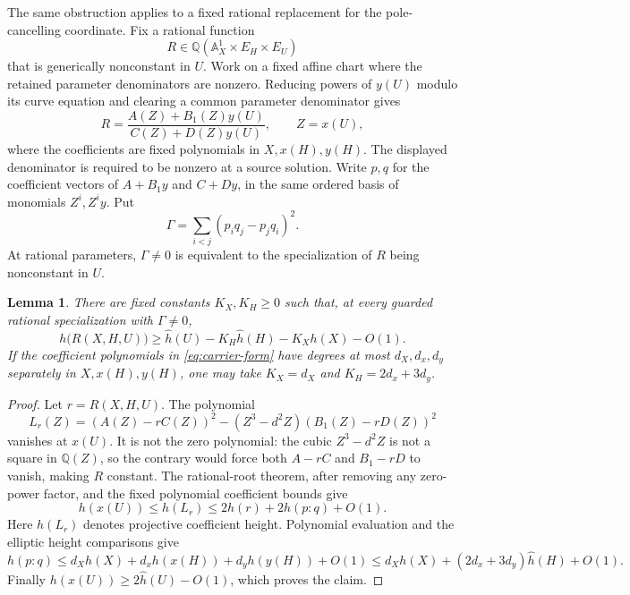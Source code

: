 \documentclass[11pt,a4paper]{article}
\newtheorem{lemma}[theorem]{Lemma}
\newcommand{\Q}{\mathbb Q}\newcommand{\Z}{\mathbb Z}
\begin{document}
The same obstruction applies to a fixed rational replacement for the
pole-cancelling coordinate. Fix a rational function
\[
 R\in\Q(\mathbb A^1_X\times E_H\times E_U)
\]
that is generically nonconstant in $U$. Work on a fixed affine chart
where the retained parameter denominators are nonzero. Reducing
powers of $y(U)$ modulo its curve equation and clearing a common
parameter denominator gives
\begin{equation}\label{eq:carrier-form}
 R=\frac{A(Z)+B_1(Z)y(U)}{C(Z)+D(Z)y(U)},\qquad Z=x(U),
\end{equation}
where the coefficients are fixed polynomials in $X,x(H),y(H)$.
The displayed denominator is required to be nonzero at a source
solution. Write $p,q$ for the coefficient vectors of $A+B_1y$
and $C+Dy$, in the same ordered basis of monomials $Z^i,Z^iy$.
Put
\[
                   \Gamma=\sum_{i<j}(p_iq_j-p_jq_i)^2.
\]
At rational parameters, $\Gamma\ne0$ is equivalent to the
specialization of $R$ being nonconstant in $U$.

\begin{lemma}\label{lem:carrier-height}
There are fixed constants $K_X,K_H\ge0$ such that, at every
guarded rational specialization with $\Gamma\ne0$,
\[
 h\bigl(R(X,H,U)\bigr)
       \ge\widehat h(U)-K_H\widehat h(H)-K_Xh(X)-O(1).
\]
If the coefficient polynomials in \eqref{eq:carrier-form} have
degrees at most $d_X,d_x,d_y$ separately in $X,x(H),y(H)$,
one may take $K_X=d_X$ and $K_H=2d_x+3d_y$.
\end{lemma}
\begin{proof}
Let $r=R(X,H,U)$. The polynomial
\[
 L_r(Z)=(A(Z)-rC(Z))^2
              -(Z^3-d^2Z)(B_1(Z)-rD(Z))^2
\]
vanishes at $x(U)$. It is not the zero polynomial: the cubic
$Z^3-d^2Z$ is not a square in $\Q(Z)$, so the contrary would
force both $A-rC$ and $B_1-rD$ to vanish, making $R$ constant.
The rational-root theorem, after removing any zero-power factor,
and the fixed polynomial coefficient bounds give
\[
 h(x(U))\le h(L_r)
              \le2h(r)+2h(p:q)+O(1).
\]
Here $h(L_r)$ denotes projective coefficient height. Polynomial
evaluation and the elliptic height comparisons give
\[
 h(p:q)\le d_Xh(X)+d_xh(x(H))+d_yh(y(H))+O(1)
 \le d_Xh(X)+(2d_x+3d_y)\widehat h(H)+O(1).
\]
Finally $h(x(U))\ge2\widehat h(U)-O(1)$, which proves the claim.
\end{proof}
\end{document}
